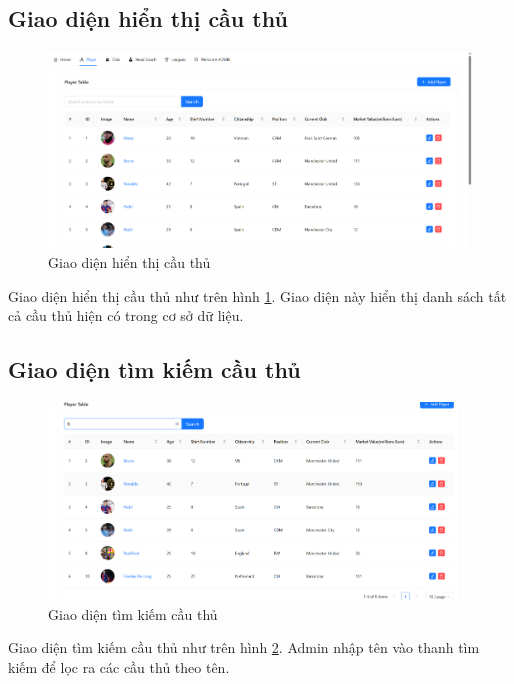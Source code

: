 \documentclass[../BTL.tex]{subfiles}
\begin{document}
\subsection{Giao diện hiển thị cầu thủ}
\begin{figure}
    \centering
    \includegraphics[width=1\linewidth]{Hinhve/admin_players.png}
    \caption{Giao diện hiển thị cầu thủ}
    \label{fig:admin_players}
\end{figure}
Giao diện hiển thị cầu thủ như trên hình \ref{fig:admin_players}. Giao diện này hiển thị danh sách tất cả cầu thủ hiện có trong cơ sở dữ liệu.

\subsection{Giao diện tìm kiếm cầu thủ}
\begin{figure}
    \centering
    \includegraphics[width=1\linewidth]{Hinhve/admin_search_player.png}
    \caption{Giao diện tìm kiếm cầu thủ}
    \label{fig:admin_search_player}
\end{figure}
Giao diện tìm kiếm cầu thủ như trên hình \ref{fig:admin_search_player}. Admin nhập tên vào thanh tìm kiếm để lọc ra các cầu thủ theo tên.
\end{document}
